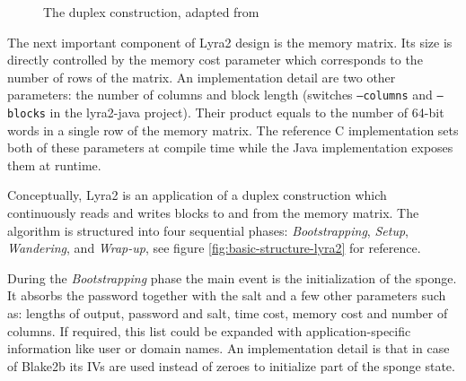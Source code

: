 \begin{figure}
  \caption{The duplex construction, adapted from \cite{bertoni:2011:duplexing,marcos:2015:lyra2}}
  \label{figure:duplex-construction}
\end{figure}

The next important component of Lyra2 design is the memory matrix. Its size is directly controlled by the memory cost parameter which corresponds to the number of rows of the matrix. An implementation detail are two other parameters: the number of columns and block length (switches \texttt{--columns} and \texttt{--blocks} in the lyra2-java project). Their product equals to the number of 64-bit words in a single row of the memory matrix. The reference C implementation sets both of these parameters at compile time while the Java implementation exposes them at runtime.

Conceptually, Lyra2 is an application of a duplex construction which continuously reads and writes blocks to and from the memory matrix. The algorithm is structured into four sequential phases: \emph{Bootstrapping}, \emph{Setup}, \emph{Wandering}, and \emph{Wrap-up}, see figure \ref{fig:basic-structure-lyra2} for reference.

During the \emph{Bootstrapping} phase the main event is the initialization of the sponge. It absorbs the password together with the salt and a few other parameters such as: lengths of output, password and salt, time cost, memory cost and number of columns. If required, this list could be expanded with application-specific information like user or domain names. An implementation detail is that in case of Blake2b its IVs are used instead of zeroes to initialize part of the sponge state.

